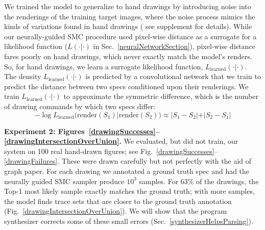 \documentclass{article}
\theoremstyle{definition}
\begin{document}
 We trained the model
to generalize to hand drawings by introducing noise into the
renderings of the training target images, where the noise process  mimics the kinds of variations found in hand drawings (%
see supplement for details).
While our neurally-guided SMC procedure
used pixel-wise distance as a surrogate for a likelihood function ($L(\cdot|\cdot)$ in Sec.~\ref{neuralNetworkSection}),
 pixel-wise distance fares poorly on hand drawings, which never exactly match
the model's renders.
So, for hand drawings,
we learn a surrogate likelihood function,
$L_{\text{learned}}(\cdot|\cdot)$.
The density $L_{\text{learned}}(\cdot|\cdot)$ is predicted by a convolutional network that we train to predict
the distance between two specs conditioned upon their renderings.
We train $L_{\text{learned}}(\cdot |\cdot )$  to approximate the symmetric difference,
which is  the number of drawing commands by which two specs  differ:
  \begin{equation}
    -\log L_{\text{learned}}(\text{render}(S_1)|\text{render}(S_2))\approx |S_1 - S_2| + |S_2 - S_1|\label{symmetricDistance}
    \end{equation}




  \textbf{Experiment 2: Figures~\ref{drawingSuccesses}--\ref{drawingIntersectionOverUnion}.}
    We evaluated, but did not train, our system on 100 real hand-drawn figures; see Fig.~\ref{drawingSuccesses}--\ref{drawingFailures}.
These were drawn carefully but not perfectly with the aid of graph paper.
For each drawing we annotated a ground truth spec and had the neurally guided SMC sampler
produce $10^3$ samples. %
For 63\% of the drawings, the Top-1 most likely sample exactly matches the
ground truth; with more samples, the model finds trace sets
that are closer to the ground truth annotation (Fig.~\ref{drawingIntersectionOverUnion}).
We will show that the program synthesizer
corrects some of these small errors (Sec.~\ref{synthesizerHelpsParsing}).
\end{document}
